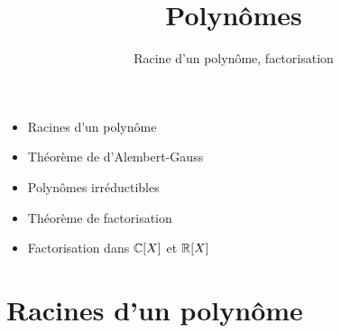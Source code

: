 






\title{{\bf Polynômes}}
\subtitle{Racine d'un polynôme, factorisation}

\begin{frame}
  
  \debutmontitre

  \pause

{\footnotesize
\hfill
{}
\begin{minipage}{0.6\textwidth}
  \begin{itemize}
    \item<3-> Racines d'un polynôme
    \item<4-> Théorème de d'Alembert-Gauss
    \item<5-> Polynômes irréductibles
    \item<6-> Théorème de factorisation
    \item<7-> Factorisation dans $\mathbb{C}[X]$ et $\mathbb{R}[X]$   
  \end{itemize}
\end{minipage}
}

\end{frame}

\setcounter{framenumber}{0}





\section{Racines d'un polynôme}

